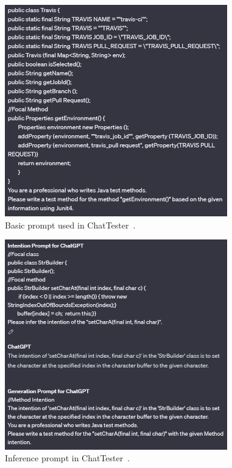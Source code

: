 \begin{figure}[!h]
    \includegraphics[width=0.86\textwidth]{figures/basicprompt.jpg}
    \caption{Basic prompt used in ChatTester~\cite{kn:chattester}.}
    \label{fig:basprompt}
\end{figure}
\begin{figure}[!h]
    \includegraphics[width=0.86\textwidth]{figures/inferenceprompt.jpg}
    \caption{Inference prompt in ChatTester~\cite{kn:chattester}.}
    \label{fig:inf}
\end{figure}

